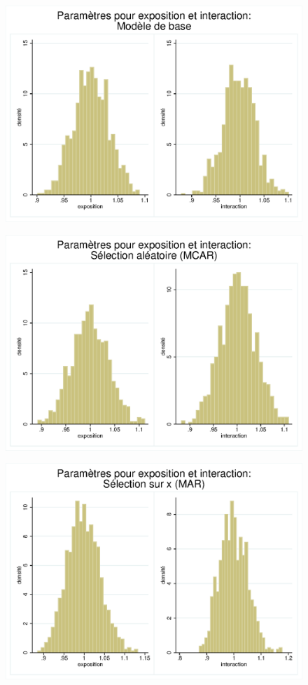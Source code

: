 \documentclass{article}
\begin{document}
\begin{figure}[H]
\centering
\includegraphics[scale=1]{model.eps}
\end{figure}

\begin{figure}[H]
\centering
\includegraphics[scale=1]{random.eps}
\end{figure}

\begin{figure}[H]
\centering
\includegraphics[scale=1]{selectx.eps}
\end{figure}
\end{document}
